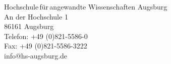 \documentclass{scrartcl}
\begin{document}
\begin{titlepage}
\begin{minipage}[t]{0.2\textwidth}
    \vspace{15mm}
    
    \textcolor{HSAred}{Hochschule\,für\,angewandte Wissenschaften Augsburg}\\
    \textcolor{HSAred}{An der Hochschule 1}\\
    \textcolor{HSAred}{86161 Augsburg}\\
    \textcolor{HSAred}{Telefon: +49 (0)821-5586-0}\\
    \textcolor{HSAred}{Fax: +49 (0)821-5586-3222}\\
    \textcolor{HSAred}{info@hs-augsburg.de}\\
    
  \end{minipage}
\end{titlepage}
\end{document}
